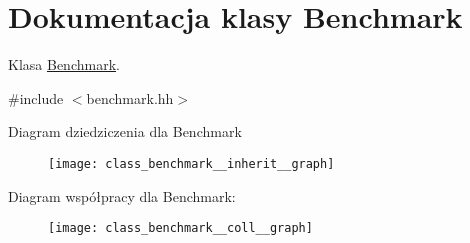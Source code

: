\hypertarget{class_benchmark}{\section{Dokumentacja klasy Benchmark}
\label{class_benchmark}
}


Klasa \hyperlink{class_benchmark}{Benchmark}.  




{\ttfamily \#include $<$benchmark.\-hh$>$}



Diagram dziedziczenia dla Benchmark
\nopagebreak
\begin{figure}[H]
\begin{center}
\leavevmode
\texttt{[image: class\_benchmark\_\_inherit\_\_graph]}
\end{center}
\end{figure}


Diagram współpracy dla Benchmark\-:
\nopagebreak
\begin{figure}[H]
\begin{center}
\leavevmode
\texttt{[image: class\_benchmark\_\_coll\_\_graph]}
\end{center}
\end{figure}

